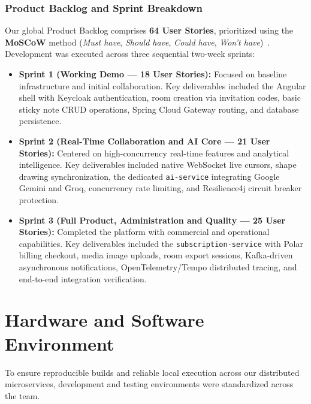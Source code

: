 \subsubsection{Product Backlog and Sprint Breakdown}
Our global Product Backlog comprises \textbf{64 User Stories}, prioritized using the \textbf{MoSCoW} method (\textit{Must have}, \textit{Should have}, \textit{Could have}, \textit{Won't have})~\cite{clegg1994case}. Development was executed across three sequential two-week sprints:

\begin{itemize}[leftmargin=1.5em]
    \item \textbf{Sprint 1 (Working Demo --- 18 User Stories):} Focused on baseline infrastructure and initial collaboration. Key deliverables included the Angular shell with Keycloak authentication, room creation via invitation codes, basic sticky note CRUD operations, Spring Cloud Gateway routing, and database persistence.
    \item \textbf{Sprint 2 (Real-Time Collaboration and AI Core --- 21 User Stories):} Centered on high-concurrency real-time features and analytical intelligence. Key deliverables included native WebSocket live cursors, shape drawing synchronization, the dedicated \texttt{ai-service} integrating Google Gemini and Groq, concurrency rate limiting, and Resilience4j circuit breaker protection.
    \item \textbf{Sprint 3 (Full Product, Administration and Quality --- 25 User Stories):} Completed the platform with commercial and operational capabilities. Key deliverables included the \texttt{subscription-service} with Polar billing checkout, media image uploads, room export sessions, Kafka-driven asynchronous notifications, OpenTelemetry/Tempo distributed tracing, and end-to-end integration verification.
\end{itemize}


\section{Hardware and Software Environment}
\label{sec:env_hardware_software}

To ensure reproducible builds and reliable local execution across our distributed microservices, development and testing environments were standardized across the team.

